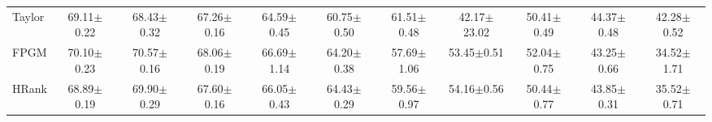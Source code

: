 \begin{table}[t]
{\begin{tabular}{lcccccccccc}
Taylor & 69.11$\pm$0.22 & 68.43$\pm$0.32 & 67.26$\pm$0.16 & 64.59$\pm$0.45 & 60.75$\pm$0.50 & 61.51$\pm$0.48 & 42.17$\pm$23.02 & 50.41$\pm$0.49 & 44.37$\pm$0.48 & 42.28$\pm$0.52 \\
FPGM & 70.10$\pm$0.23 & 70.57$\pm$0.16 & 68.06$\pm$0.19 & 66.69$\pm$1.14 & 64.20$\pm$0.38 & 57.69$\pm$1.06 & 53.45$\pm$0.51 & 52.04$\pm$0.75 & 43.25$\pm$0.66 & 34.52$\pm$1.71 \\
HRank & 68.89$\pm$0.19 & 69.90$\pm$0.29 & 67.60$\pm$0.16 & 66.05$\pm$0.43 & 64.43$\pm$0.29 & 59.56$\pm$0.97 & 54.16$\pm$0.56 & 50.44$\pm$0.77 & 43.85$\pm$0.31 & 35.52$\pm$0.71 \\
\bottomrule
\end{tabular}}
\end{table}
